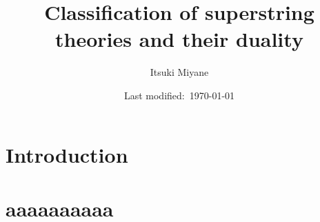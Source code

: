 \documentclass[a4paper,pdftex,10pt]{article}
\begin{document}
\title{
  Classification of superstring theories and their duality
}
\author{
  Itsuki Miyane
}
\date{Last modified:\ \today}

\maketitle

\tableofcontents

\clearpage
\section{Introduction}




















\clearpage
\section{aaaaaaaaaa}





















\clearpage



\nocite{Polchinski:1998rq}
\nocite{Polchinski:1998rr}

\end{document}
